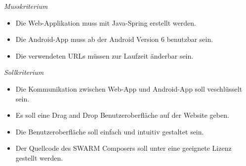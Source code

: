 \textit{Musskriterium}

\begin{itemize}[leftmargin=4pc]
	\item Die Web-Applikation muss mit Java-Spring erstellt werden.
	\item Die Android-App muss ab der Android Version 6 benutzbar sein.
	\item Die verwendeten URLs müssen zur Laufzeit änderbar sein.
\end{itemize}

\textit{Sollkriterium}

\begin{itemize}[leftmargin=4pc]
	\item Die Kommunikation zwischen Web-App und Android-App soll veschlüsselt sein.
	\item Es soll eine Drag and Drop Benutzeroberfläche auf der Website geben.
	\item Die Benutzeroberfläche soll einfach und intuitiv gestaltet sein.
	\item Der Quellcode des SWARM Composers soll unter eine geeignete Lizenz gestellt werden.
\end{itemize}

